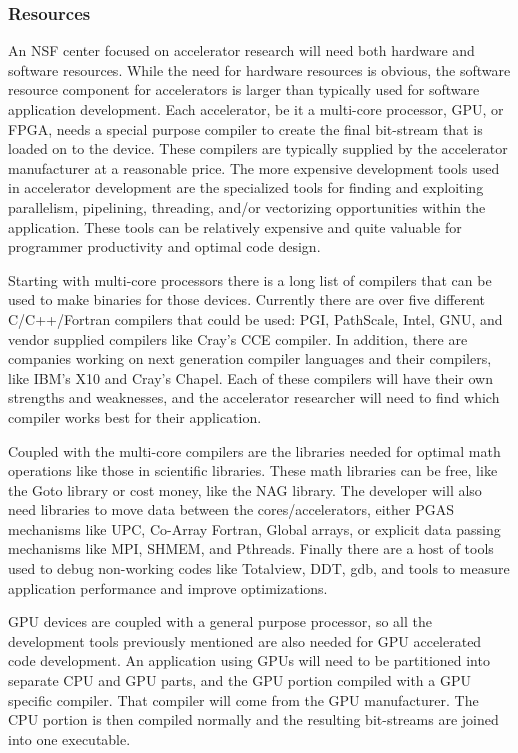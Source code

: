 \subsubsection{Resources}
An NSF center focused on accelerator research will need both hardware and software resources. While the need for hardware resources is obvious, the software resource component for accelerators is larger
than typically used for software application development. Each accelerator, be it a multi-core processor, GPU, or FPGA, needs a special purpose compiler to create the final bit-stream that is loaded on to the device. These compilers are typically supplied by the accelerator manufacturer at a reasonable price. The more expensive development tools used in accelerator development are the specialized tools for finding and exploiting parallelism, pipelining, threading, and/or vectorizing opportunities within the application. These tools can be relatively expensive and quite valuable for programmer productivity and optimal code design.

Starting with multi-core processors there is a long list of compilers that can be used to make binaries for those devices. Currently there are over five different C/C++/Fortran compilers that could be used: PGI, PathScale, Intel, GNU, and vendor supplied compilers like Cray's CCE compiler. In addition, there are companies working on next generation compiler languages and their compilers, like IBM's X10 and Cray's Chapel. Each of these compilers will have their own strengths and weaknesses, and the accelerator researcher will need to find which compiler works best for their application.

Coupled with the multi-core compilers are the libraries needed for optimal math operations like those in scientific libraries. These math libraries can be free, like the Goto library or cost money, like the NAG library. The developer will also need libraries to move data between the cores/accelerators, either PGAS mechanisms like UPC, Co-Array Fortran, Global arrays, or explicit data passing mechanisms like MPI, SHMEM, and Pthreads. Finally there are a host of tools used to debug non-working codes like Totalview, DDT, gdb, and tools to measure application performance and improve optimizations.

GPU devices are coupled with a general purpose processor, so all the development tools previously mentioned are also needed for GPU accelerated code development. An application using GPUs will need to be partitioned into separate CPU and GPU parts, and the GPU portion compiled with a GPU specific compiler. That compiler will come from the GPU manufacturer. The CPU portion is then compiled normally and the resulting bit-streams are joined into one executable.

